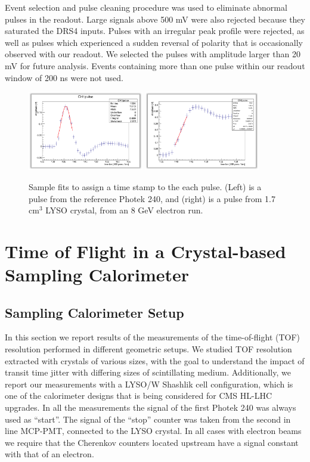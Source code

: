 \documentclass[11pt]{article}
\begin{document}
Event selection and pulse cleaning procedure was used to eliminate abnormal
pulses in the readout. Large signals above 500 mV were also rejected because
they saturated the DRS4 inputs. Pulses with an irregular peak profile were
rejected, as well as pulses which experienced a sudden reversal of polarity that
is occasionally observed with our readout. We selected the pulses with amplitude
larger than 20 mV for future analysis. Events containing more than one pulse
within our readout window of 200 ns were not used. 

\begin{figure}[h] \centering
\includegraphics[width=0.45\textwidth]{figs/RefPulseFit} 
\includegraphics[width=0.45\textwidth]{figs/ScintPulseFit} 
\caption{Sample fits to assign a time stamp to the each pulse. (Left) is a  pulse from the reference Photek 240, and (right) is a  pulse from 1.7 cm$^3$ LYSO crystal, from an 8 GeV electron run.} 
\label{fig:PulseFits}
\end{figure}


\section{Time of Flight in a Crystal-based Sampling Calorimeter}

\subsection{Sampling Calorimeter Setup}


In this section we report results of the
measurements of the time-of-flight (TOF) resolution performed in different
geometric setups. We studied TOF resolution extracted with crystals of various
sizes, with the goal to understand the impact of transit time jitter with
differing sizes of scintillating medium. Additionally, we report our
measurements with a LYSO/W Shashlik cell configuration, which is one of the
calorimeter designs that is being considered for CMS HL-LHC upgrades. In all the
measurements the signal of the first Photek 240 was always used as ``start''.
The signal of the ``stop'' counter was taken from the second in line MCP-PMT,
connected to the LYSO crystal. In all cases with electron beams we require that
the Cherenkov counters located upstream have a signal constant with that of an
electron. 
\end{document}
